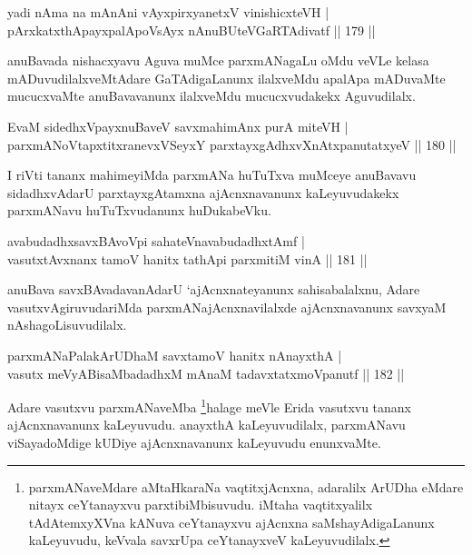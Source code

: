 \begin{shl}
yadi nAma na mAnAni vAyxpirxyanetxV vinishicxteVH | \\
pArxkatxthA\s payxpalApoV\s sAyx nAnuBUteVGaRTAdivatf \hfill||  179 ||  
\end{shl}

\begin{artha}
anuBavada nishacxyavu Aguva muMce parxmANagaLu oMdu veVLe kelasa mADuvudilalxveMtAdare GaTAdigaLanunx ilalxveMdu apalApa mADuvaMte mucucxvaMte anuBavavanunx ilalxveMdu mucucxvudakekx Aguvudilalx.
\end{artha}

\begin{shl}
EvaM sidedhxV\s payxnuBaveV savxmahimAnx purA miteVH |  \\
parxmANoVtapxtitxranevxVSeyxY parxtayxgAdhxvXnAtxpanutatxyeV \hfill||  180 ||  
\end{shl}

\begin{artha}
I riVti tananx mahimeyiMda parxmANa huTuTxva muMceye anuBavavu sidadhxvAdarU parxtayxgAtamxna ajAcnxnavanunx kaLeyuvudakekx parxmANavu huTuTxvudanunx huDukabeVku.
\end{artha}


\begin{shl}
avabudadhxsavxBAvoV\s pi sahateV\s navabudadhxtAmf | \\
vasutxtAvxnanx tamoV hanitx tathA\s pi parxmitiM vinA \hfill||  181 ||  
\end{shl}

\begin{artha}
anuBava savxBAvadavanAdarU `ajAcnxnateyanunx sahisabalalxnu, Adare vasutxvAgiruvudariMda parxmANajAcnxnavilalxde ajAcnxnavanunx savxyaM nAshagoLisuvudilalx.
\end{artha}

\begin{shl}
parxmANaPalakArUDhaM savxtamoV hanitx nAnayxthA | \\
vasutx meVyABisaMbadadhxM mAnaM tadavxtatxmoVpanutf \hfill||  182 ||  
\end{shl}

\begin{artha}
Adare vasutxvu parxmANaveMba \footnote{parxmANaveMdare aMtaHkaraNa vaqtitxjAcnxna, adaralilx ArUDha eMdare nitayx ceYtanayxvu parxtibiMbisuvudu. iMtaha vaqtitxyalilx tAdAtemxyXVna kANuva ceYtanayxvu ajAcnxna saMshayAdigaLanunx kaLeyuvudu, keVvala savxrUpa ceYtanayxveV kaLeyuvudilalx.}halage meVle Erida vasutxvu tananx ajAcnxnavanunx kaLeyuvudu. anayxthA kaLeyuvudilalx, parxmANavu viSayadoMdige kUDiye ajAcnxnavanunx kaLeyuvudu enunxvaMte.
\end{artha}

